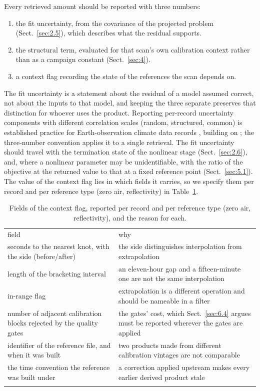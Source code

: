 Every retrieved amount should be reported with three numbers:
\begin{enumerate}
\item the fit uncertainty, from the covariance of the projected problem (Sect.~\ref{sec:2.5}), which describes what
   the residual supports.
\item the structural term, evaluated for that scan's own calibration context rather than as a campaign constant
   (Sect.~\ref{sec:4}).
\item a context flag recording the state of the references the scan depends on.
\end{enumerate}
The fit uncertainty is a statement about the residual of a model assumed correct, not about the inputs to that model,
and keeping the three separate preserves that distinction for whoever uses the product. Reporting per-record uncertainty
components with different correlation scales (random, structured, common) is established practice for Earth-observation
climate data records \citep{Merchant_2017}, building on \citet{JCGM_2008}; the three-number convention applies it to a single
retrieval. The fit uncertainty should
travel with the termination state of the nonlinear stage (Sect.~\ref{sec:2.6}), and, where a nonlinear parameter may be
unidentifiable, with the ratio of the objective at the returned value to that at a fixed reference point
(Sect.~\ref{sec:5.1}). The value of the context flag lies in which fields it carries, so we specify them per record and
per reference type (zero air, reflectivity) in Table~\ref{tab:context_fields}.

\begin{table}[t]
\caption{Fields of the context flag, reported per record and per reference type (zero air, reflectivity), and the reason for each.}
\label{tab:context_fields}
\begin{tabular}{>{\raggedright\arraybackslash}p{}p{}}
\tophline
field & why \\
\middlehline
seconds to the nearest knot, with the side (before/after) & the side distinguishes interpolation from extrapolation \\
length of the bracketing interval & an eleven-hour gap and a fifteen-minute one are not the same interpolation \\
in-range flag & extrapolation is a different operation and should be nameable in a filter \\
number of adjacent calibration blocks rejected by the quality gates & the gates' cost, which Sect.~\ref{sec:6.4} argues must be reported wherever the gates are applied \\
identifier of the reference file, and when it was built & two products made from different calibration vintages are not comparable \\
the time convention the reference was built under & a correction applied upstream makes every earlier derived product stale \\
\bottomhline
\end{tabular}
\end{table}

